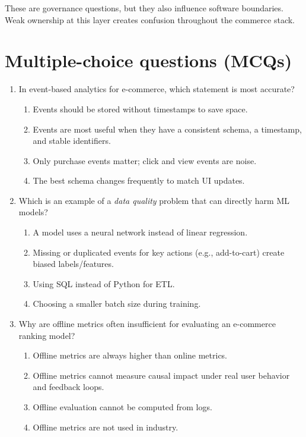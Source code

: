 These are governance questions, but they also influence software boundaries.
Weak ownership at this layer creates confusion throughout the commerce stack.

\section{Multiple-choice questions (MCQs)}
\begin{enumerate}
  \item In event-based analytics for e-commerce, which statement is most accurate?
  \begin{enumerate}
    \item Events should be stored without timestamps to save space.
    \item Events are most useful when they have a consistent schema, a timestamp, and stable identifiers.
    \item Only purchase events matter; click and view events are noise.
    \item The best schema changes frequently to match UI updates.
  \end{enumerate}

  \item Which is an example of a \emph{data quality} problem that can directly harm ML models?
  \begin{enumerate}
    \item A model uses a neural network instead of linear regression.
    \item Missing or duplicated events for key actions (e.g., add-to-cart) create biased labels/features.
    \item Using SQL instead of Python for ETL.
    \item Choosing a smaller batch size during training.
  \end{enumerate}

  \item Why are offline metrics often insufficient for evaluating an e-commerce ranking model?
  \begin{enumerate}
    \item Offline metrics are always higher than online metrics.
    \item Offline metrics cannot measure causal impact under real user behavior and feedback loops.
    \item Offline evaluation cannot be computed from logs.
    \item Offline metrics are not used in industry.
  \end{enumerate}


\end{enumerate}
